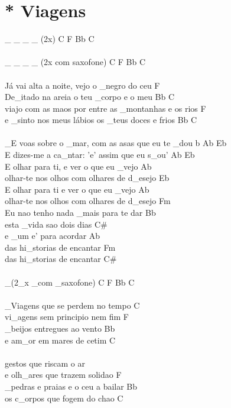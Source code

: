 \documentclass{article}
\begin{document}
\section{ * Viagens}
_ _ _ _ (2x)     C F Bb C \\
\\
_ _ _ _ (2x com saxofone)     C F Bb C\\
\\
Já vai alta a noite, vejo o _negro do ceu      F\\
De_itado na areia o teu _corpo e o meu      Bb C\\
viajo com as maos por entre as _montanhas e os rios      F \\
e _sinto nos meus lábios os _teus doces e frios      Bb C\\
\\
_E voas sobre o _mar, com as asas que eu te _dou     b Ab Eb \\
E dizes-me a ca_ntar: 'e' assim que eu s_ou'      Ab Eb\\
E olhar para ti, e ver o que eu _vejo      Ab\\
olhar-te nos olhos com olhares de d_esejo      Eb\\
E olhar para ti e ver o que eu _vejo      Ab\\
olhar-te nos olhos com olhares de d_esejo      Fm\\
Eu nao tenho nada _mais para te dar      Bb \\
esta _vida sao dois dias      C# \\
e _um e' para acordar      Ab\\
das hi_storias de encantar      Fm \\
das hi_storias de encantar      C#\\
\\
_(2_x _com _saxofone)     C F Bb C \\
\\
_Viagens que se perdem no tempo     C \\
vi_agens sem principio nem fim      F \\
_beijos entregues ao vento     Bb \\
e am_or em mares de cetim      C\\
\\
gestos que riscam o ar\\
e olh_ares que trazem solidao      F\\
_pedras e praias e o ceu a bailar     Bb \\
os c_orpos que fogem do chao      C\\
\end{document}
